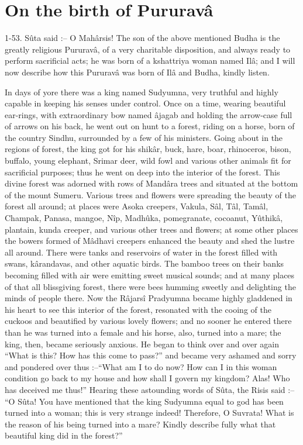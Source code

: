 \chapter{On the birth of Pururav\^a}

1-53. S\^uta said :-- O Mah\^arsis! The son of the above mentioned Budha is the greatly religious Pururav\^a, of a very charitable disposition, and always ready to perform sacrificial acts; he was born of a kshattriya woman named Il\^a; and I will now describe how this Pururav\^a was born of Il\^a and Budha, kindly listen.

In days of yore there was a king named Sudyumna, very truthful and highly capable in keeping his senses under control. Once on a time, wearing beautiful ear-rings, with extraordinary bow named \^ajagab and holding the arrow-case full of arrows on his back, he went out on hunt to a forest, riding on a horse, born of the country Sindhu, surrounded by a few of his ministers. Going about in the regions of forest, the king got for his shik\^ar, buck, hare, boar, rhinoceros, bison, buffalo, young elephant, Srimar deer, wild fowl and various other animals fit for sacrificial purposes; thus he went on deep into the interior of the forest. This divine forest was adorned with rows of Mand\^ara trees and situated at the bottom of the mount Sumeru. Various trees and flowers were spreading the beauty of the forest all around; at places were Asoka creepers, Vakula, S\^al, T\^al, Tam\^al, Champak, Panasa, mangoe, N\^ip, Madh\^uka, pomegranate, cocoanut, Y\^uthik\^a, plantain, kunda creeper, and various other trees and flowers; at some other places the bowers formed of M\^adhavi creepers enhanced the beauty and shed the lustre all around. There were tanks and reservoirs of water in the forest filled with swans, k\^arandavas, and other aquatic birds. The bamboo trees on their banks becoming filled with air were emitting sweet musical sounds; and at many places of that all blissgiving forest, there were bees humming sweetly and delighting the minds of people there. Now the R\^ajars\^i Pradyumna became highly gladdened in his heart to see this interior of the forest, resonated with the cooing of the cuckoos and beautified by various lovely flowers; and no sooner he entered there than he was turned into a female and his horse, also, turned into a mare; the king, then, became seriously anxious. He began to think over and over again ``What is this? How has this come to pass?'' and became very ashamed and sorry and pondered over thus :--``What am I to do now? How can I in this woman condition go back to my house and how shall I govern my kingdom? Alas! Who has deceived me thus!'' Hearing these astounding words of S\^uta, the Risis said :-- ``O S\^uta! You have mentioned that the king Sudyumna equal to god has been turned into a woman; this is very strange indeed! Therefore, O Suvrata! What is the reason of his being turned into a mare? Kindly describe fully what that beautiful king did in the forest?''

